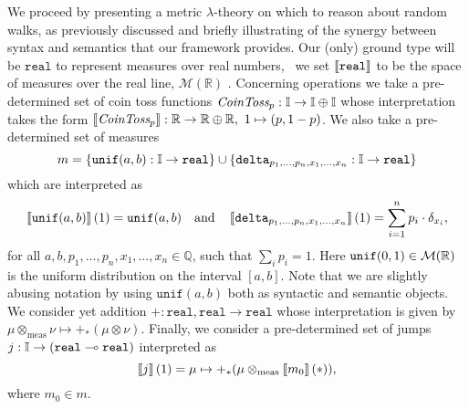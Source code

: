 We proceed by presenting a metric $\lambda$-theory on which to reason about random walks, as previously discussed and briefly illustrating of the synergy between syntax and semantics that our framework provides. Our (only) ground type
will be $\mathtt{real}$ to represent measures over real numbers, \ie\ we set
$\left \llbracket \mathtt{real} \right \rrbracket$ to be the space of measures over the real line, $\mathcal{M}(\mathbb{R})$ .
Concerning operations we take a pre-determined set of coin toss functions $\emph{CoinToss}_p : \mathbb{I} \to \mathbb{I} \oplus \mathbb{I}$ whose interpretation takes the form $\left \llbracket \emph{CoinToss}_p \right \rrbracket:\mathbb{R} \to \mathbb{R} \oplus \mathbb{R},\ 1 \mapsto (p, 1-p)$.
We also take a pre-determined set of measures 
$$ m = \{\mathtt{unif}(a,b) : \mathbb{I} \to \mathtt{real} \} \cup \{\mathtt{delta}_{p_1,\ldots,p_n,x_1,\ldots,x_n} : \mathbb{I} \to \mathtt{real}\} $$ which are interpreted as 
$$ \left \llbracket \mathtt{unif}(a,b) \right \rrbracket (1) = \mathtt{unif}(a,b) \quad \text{and} \quad \left \llbracket \mathtt{delta}_{p_1,\ldots,p_n, x_1,\ldots,x_n} \right \rrbracket(1) = \sum_{i=1}^n p_i\cdot \delta_{x_i},  $$
for all $a,b, p_1,\ldots,p_n,  x_1,\ldots,x_n \in \mathbb{Q}$, such that $\sum_i p_i = 1$. Here $\mathtt{unif}(0,1) \in \mathcal{M}(\mathbb{R})$ is the uniform distribution on the interval $[a,b]$.
Note that we are slightly abusing notation by using $\mathtt{unif}(a,b)$ both as syntactic and semantic objects. We consider yet addition $+ : \mathtt{real},\mathtt{real}
\to \mathtt{real}$ whose interpretation is given by $\mu \otimes_{\text{meas}} \nu \mapsto
+_\ast(\mu \otimes \nu)$.
Finally, we consider a pre-determined set of jumps $j: \mathbb{I} \to (\mathtt{real} \multimap \mathtt{real}) $ interpreted as 
\[ 
\left \llbracket j \right \rrbracket(1)= \mu \mapsto +_\ast(\mu \otimes_{\text{meas}} \left \llbracket m_0 \right \rrbracket(*)),
\]
where $m_0 \in m$.




